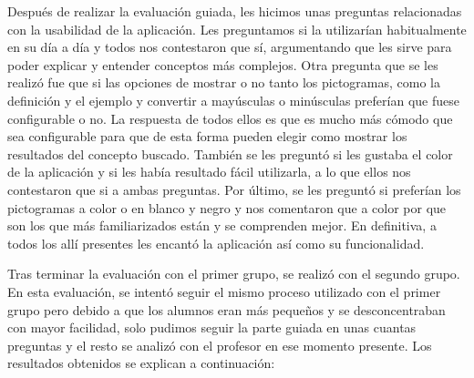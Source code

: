Después de realizar la evaluación guiada, les hicimos unas preguntas relacionadas con la usabilidad de la aplicación. Les preguntamos si la utilizarían habitualmente en su día a día y todos nos contestaron que sí, argumentando que les sirve para poder explicar y entender conceptos más complejos. Otra pregunta que se les realizó fue que si las opciones de mostrar o no tanto los pictogramas, como la definición y el ejemplo y convertir a mayúsculas o minúsculas preferían que fuese configurable o no. La respuesta de todos ellos es que es mucho más cómodo que sea configurable para que de esta forma pueden elegir como mostrar los resultados del concepto buscado.
También se les preguntó si les gustaba el color de la aplicación y si les había resultado fácil utilizarla, a lo que ellos nos contestaron que si a ambas preguntas.
Por último, se les preguntó si preferían los pictogramas a color o en blanco y negro y nos comentaron que a color por que son los que más familiarizados están y se comprenden mejor.
En definitiva, a todos los allí presentes les encantó la aplicación así como su funcionalidad.

Tras terminar la evaluación con el primer grupo, se realizó con el segundo grupo. En esta evaluación, se intentó seguir el mismo proceso utilizado con el primer grupo pero debido a que los alumnos eran más pequeños y se desconcentraban con mayor facilidad, solo pudimos seguir la parte guiada en unas cuantas preguntas y el resto se analizó con el profesor en ese momento presente. Los resultados obtenidos se explican a continuación:

